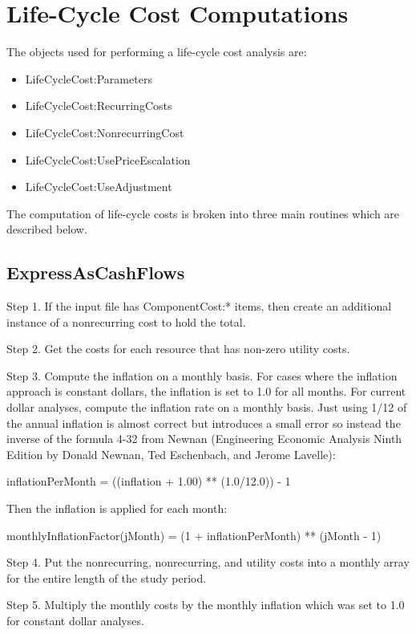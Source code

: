 \section{Life-Cycle Cost Computations}\label{life-cycle-cost-computations}

The objects used for performing a life-cycle cost analysis are:

\begin{itemize}
\item
  LifeCycleCost:Parameters
\item
  LifeCycleCost:RecurringCosts
\item
  LifeCycleCost:NonrecurringCost
\item
  LifeCycleCost:UsePriceEscalation
\item
  LifeCycleCost:UseAdjustment
\end{itemize}

The computation of life-cycle costs is broken into three main routines which are described below.

\subsection{ExpressAsCashFlows}\label{expressascashflows}

Step 1. If the input file has ComponentCost:* items, then create an additional instance of a nonrecurring cost to hold the total.

Step 2. Get the costs for each resource that has non-zero utility costs.

Step 3. Compute the inflation on a monthly basis. For cases where the inflation approach is constant dollars, the inflation is set to 1.0 for all months. For current dollar analyses, compute the inflation rate on a monthly basis. Just using 1/12 of the annual inflation is almost correct but introduces a small error so instead the inverse of the formula 4-32 from Newnan (Engineering Economic Analysis Ninth Edition by Donald Newnan, Ted Eschenbach, and Jerome Lavelle):

inflationPerMonth = ((inflation + 1.00) ** (1.0/12.0)) - 1

Then the inflation is applied for each month:

monthlyInflationFactor(jMonth) = (1 + inflationPerMonth) ** (jMonth - 1)

Step 4. Put the nonrecurring, nonrecurring, and utility costs into a monthly array for the entire length of the study period.

Step 5. Multiply the monthly costs by the monthly inflation which was set to 1.0 for constant dollar analyses.


